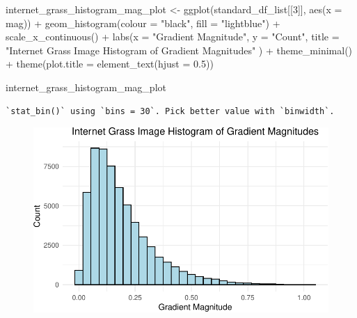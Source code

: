 \documentclass[
  letterpaper,
]{report}
\newenvironment{Shaded}{\begin{snugshade}}{\end{snugshade}}
\newcommand{\AttributeTok}[1]{\textcolor[rgb]{0.40,0.45,0.13}{#1}}
\newcommand{\DecValTok}[1]{\textcolor[rgb]{0.68,0.00,0.00}{#1}}
\newcommand{\FloatTok}[1]{\textcolor[rgb]{0.68,0.00,0.00}{#1}}
\newcommand{\FunctionTok}[1]{\textcolor[rgb]{0.28,0.35,0.67}{#1}}
\newcommand{\NormalTok}[1]{\textcolor[rgb]{0.00,0.23,0.31}{#1}}
\newcommand{\OtherTok}[1]{\textcolor[rgb]{0.00,0.23,0.31}{#1}}
\newcommand{\SpecialCharTok}[1]{\textcolor[rgb]{0.37,0.37,0.37}{#1}}
\newcommand{\StringTok}[1]{\textcolor[rgb]{0.13,0.47,0.30}{#1}}
\begin{document}
\begin{Shaded}
\begin{Highlighting}[]
\NormalTok{internet\_grass\_histogram\_mag\_plot }\OtherTok{\textless{}{-}}
  \FunctionTok{ggplot}\NormalTok{(standard\_df\_list[[}\DecValTok{3}\NormalTok{]], }
         \FunctionTok{aes}\NormalTok{(}\AttributeTok{x =}\NormalTok{ mag)) }\SpecialCharTok{+}
  \FunctionTok{geom\_histogram}\NormalTok{(}\AttributeTok{colour =} \StringTok{"black"}\NormalTok{, }\AttributeTok{fill =} \StringTok{"lightblue"}\NormalTok{) }\SpecialCharTok{+}
  \FunctionTok{scale\_x\_continuous}\NormalTok{() }\SpecialCharTok{+} 
  \FunctionTok{labs}\NormalTok{(}\AttributeTok{x =} \StringTok{"Gradient Magnitude"}\NormalTok{, }
       \AttributeTok{y =} \StringTok{"Count"}\NormalTok{, }
       \AttributeTok{title =} \StringTok{"Internet Grass Image Histogram of Gradient Magnitudes"}
\NormalTok{       ) }\SpecialCharTok{+}
  \FunctionTok{theme\_minimal}\NormalTok{() }\SpecialCharTok{+}
  \FunctionTok{theme}\NormalTok{(}\AttributeTok{plot.title =} \FunctionTok{element\_text}\NormalTok{(}\AttributeTok{hjust =} \FloatTok{0.5}\NormalTok{))}

\NormalTok{internet\_grass\_histogram\_mag\_plot}
\end{Highlighting}
\end{Shaded}

\begin{verbatim}
`stat_bin()` using `bins = 30`. Pick better value with `binwidth`.
\end{verbatim}

\begin{figure}[H]

{\centering \includegraphics{results_files/figure-pdf/unnamed-chunk-11-1.pdf}

}

\end{figure}
\end{document}
